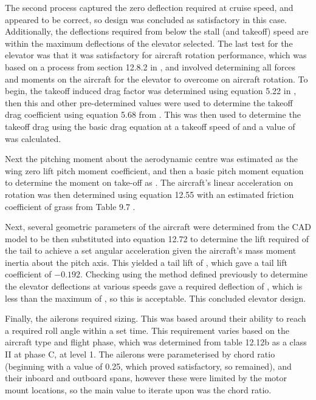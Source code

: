 \documentclass[../../main.tex]{subfiles}
\begin{document}
The second process captured the zero deflection required at cruise speed, and appeared to be correct, so design was concluded as satisfactory in this case.
Additionally, the deflections required from below the stall (and takeoff) speed are within the maximum deflections of the elevator selected.
The last test for the elevator was that it was satisfactory for aircraft rotation performance, which was based on a process from section 12.8.2 in \cite{sadraey-13}, and involved determining all forces and moments on the aircraft for the elevator to overcome on aircraft rotation.
To begin, the takeoff induced drag factor was determined using equation 5.22 in \cite{sadraey-13}, then this and other pre-determined values were used to determine the takeoff drag coefficient using equation 5.68 from \cite{sadraey-13}.
This was then used to determine the takeoff drag using the basic drag equation at a takeoff speed of  and a value of  was calculated.  

Next the pitching moment about the aerodynamic centre was estimated as the wing zero lift pitch moment coefficient, and then a basic pitch moment equation to determine the moment on take-off as .
The aircraft's linear acceleration on rotation was then determined using equation 12.55 \cite{sadraey-13} with an estimated friction coefficient of grass from Table 9.7 \cite{sadraey-13}. 

Next, several geometric parameters of the aircraft were determined from the CAD model to be then substituted into equation 12.72 \cite{sadraey-13} to determine the lift required of the tail to achieve a set angular acceleration given the aircraft's mass moment inertia about the pitch axis.
This yielded a tail lift of , which gave a tail lift coefficient of $-0.192$.
Checking using the method defined previously to determine the elevator deflections at various speeds gave a required deflection of , which is less than the maximum of , so this is acceptable.
This concluded elevator design. 

Finally, the ailerons required sizing.
This was based around their ability to reach a required roll angle within a set time.
This requirement varies based on the aircraft type and flight phase, which was determined from table 12.12b \cite{sadraey-13} as a class II at phase C, at level 1.
The ailerons were parameterised by chord ratio (beginning with a value of 0.25, which proved satisfactory, so remained), and their inboard and outboard spans, however these were limited by the motor mount locations, so the main value to iterate upon was the chord ratio.  
\end{document}
